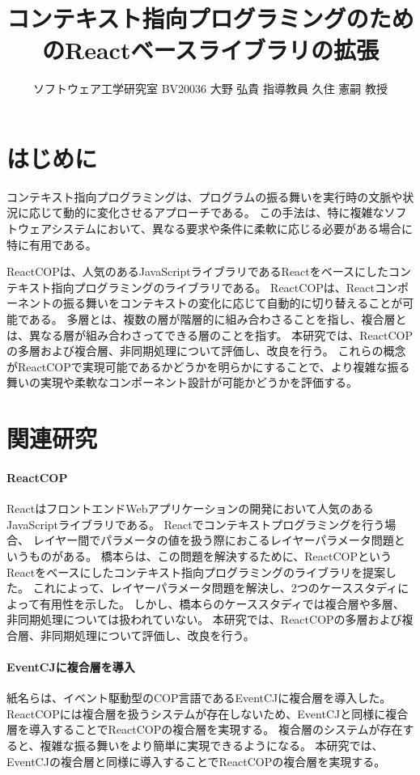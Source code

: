 \documentclass[twocolumn]{jarticle}
\title{
  \LARGE\bf
  コンテキスト指向プログラミングのためのReactベースライブラリの拡張 \\[1ex]}
\author{ソフトウェア工学研究室 \quad
        BV20036 大野 弘貴 \quad
        指導教員 久住 憲嗣 教授}
\date{}
\begin{document}
\maketitle
\thispagestyle{empty}

\section{はじめに}

コンテキスト指向プログラミングは、プログラムの振る舞いを実行時の文脈や状況に応じて動的に変化させるアプローチである。
この手法は、特に複雑なソフトウェアシステムにおいて、異なる要求や条件に柔軟に応じる必要がある場合に特に有用である。

ReactCOPは、人気のあるJavaScriptライブラリであるReactをベースにしたコンテキスト指向プログラミングのライブラリである。
ReactCOPは、Reactコンポーネントの振る舞いをコンテキストの変化に応じて自動的に切り替えることが可能である。
多層とは、複数の層が階層的に組み合わさることを指し、複合層とは、異なる層が組み合わさってできる層のことを指す。
本研究では、ReactCOPの多層および複合層、非同期処理について評価し、改良を行う。
これらの概念がReactCOPで実現可能であるかどうかを明らかにすることで、より複雑な振る舞いの実現や柔軟なコンポーネント設計が可能かどうかを評価する。

\section{関連研究}
\paragraph{ReactCOP}
ReactはフロントエンドWebアプリケーションの開発において人気のあるJavaScriptライブラリである。
Reactでコンテキストプログラミングを行う場合、 レイヤー間でパラメータの値を扱う際におこるレイヤーパラメータ問題というものがある。
橋本らは、この問題を解決するために、ReactCOPというReactをベースにしたコンテキスト指向プログラミングのライブラリを提案した。
これによって、レイヤーパラメータ問題を解決し、2つのケーススタディによって有用性を示した。
しかし、橋本らのケーススタディでは複合層や多層、非同期処理については扱われていない。
本研究では、ReactCOPの多層および複合層、非同期処理について評価し、改良を行う。

\paragraph{EventCJに複合層を導入}
紙名らは、イベント駆動型のCOP言語であるEventCJに複合層を導入した。
ReactCOPには複合層を扱うシステムが存在しないため、EventCJと同様に複合層を導入することでReactCOPの複合層を実現する。
複合層のシステムが存在すると、複雑な振る舞いをより簡単に実現できるようになる。
本研究では、EventCJの複合層と同様に導入することでReactCOPの複合層を実現する。
\end{document}
